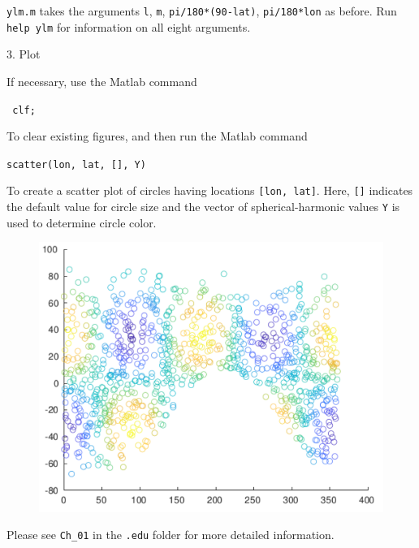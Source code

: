 \documentclass{article}
\begin{document}
\verb+ylm.m+ takes the arguments \verb+l+, \verb+m+, \verb+pi/180*(90-lat)+, \verb+pi/180*lon+ as before. Run \verb+help ylm+ for information on all eight arguments. 

3. Plot

If necessary, use the Matlab command 

\verb+ clf;+

To clear existing figures, and then run the Matlab command

\verb+scatter(lon, lat, [], Y)+

To create a scatter plot of circles having locations \verb+[lon, lat]+. Here, \verb+[]+ indicates the default value for circle size and the vector of spherical-harmonic values \verb+Y+ is used to determine circle color. 

\begin{figure}[H]
\includegraphics[scale=.75]{random_plot}
\end{figure}

Please see \verb+Ch_01+ in the \verb+.edu+ folder for more detailed information.
\end{document}
